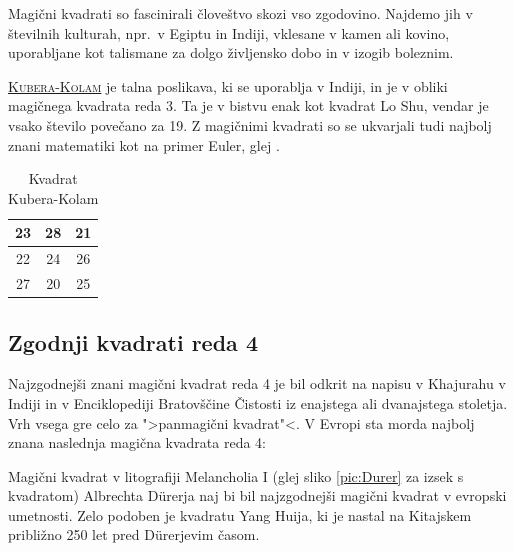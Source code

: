 \documentclass[a4paper,12pt]{article}
\newcommand{\pojem}[1]{\underline{\textsc{#1}}}
\theoremstyle{definition}
\theoremstyle{plain}
\newenvironment{magic}[3]{
   \begin{table}%
   \centering%
   \caption{#2}%
   \label{#3}%
   \large
   \begin{tabular}{|*{#1}{c|}}%
      \hline
}{
   \end{tabular}%
   \end{table}%
}
\begin{document}
Magični kvadrati so fascinirali človeštvo skozi vso zgodovino. Najdemo jih
v številnih kulturah, npr.\ v Egiptu in Indiji, vklesane v kamen ali
kovino, uporabljane kot talismane za dolgo življensko dobo in v
izogib boleznim.

\pojem{Kubera-Kolam} je talna poslikava, ki se uporablja v Indiji, in je v
obliki magičnega kvadrata reda 3. Ta je v bistvu enak kot kvadrat
Lo Shu, vendar je vsako število povečano za 19.
Z magičnimi kvadrati so se ukvarjali tudi najbolj znani matematiki kot na
primer Euler, glej \cite{euler}.
\begin{magic}{3}{Kvadrat Kubera-Kolam}{tab:Kubera}
   23 & 28 & 21 \\\hline
   22 & 24 & 26 \\\hline
   27 & 20 & 25 \\\hline
\end{magic}

\subsection{Zgodnji kvadrati reda 4}

Najzgodnejši znani magični kvadrat reda 4 je bil odkrit na napisu
v Khajurahu v Indiji in v Enciklopediji Bratovščine Čistosti iz enajstega
ali dvanajstega stoletja. Vrh vsega gre celo za ">panmagični kvadrat"<.
V Evropi sta morda najbolj znana naslednja magična kvadrata reda 4:

Magični kvadrat v litografiji Melancholia I (glej sliko \ref{pic:Durer}
za izsek s kvadratom) Albrechta Dürerja naj bi bil najzgodnejši magični kvadrat
v evropski umetnosti. Zelo podoben je kvadratu Yang Huija, ki je nastal na Kitajskem
približno 250 let pred Dürerjevim časom.
\end{document}
